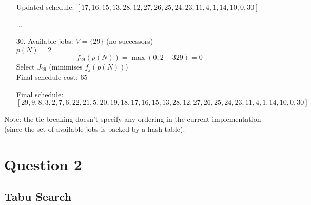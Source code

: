 \documentclass[fleqn]{article}
\begin{document}
\begin{enumerate}
      Updated schedule: $[17, 16, 15, 13, 28, 12, 27, 26, 25, 24, 23, 11, 4, 1, 14, 10, 0, 30]$

      \item[...]

      \item[30.] Available jobs: $V = \{ 29 \}$ (no successors) \\
      $p(N) = 2$
      \[
      f_{29}(p(N)) = \max(0, 2 - 329) = 0
      \]    
      Select $J_{29}$ (minimises $f_j(p(N))$) \\
      Final schedule cost: 65

      Final schedule: $[29, 9, 8, 3, 2, 7, 6, 22, 21, 5, 20, 19, 18, 17, 16, 15, 13, 28, 12, 27, 26, 25, 24, 23, 11, 4, 1, 14, 10, 0, 30]$
    \end{enumerate}

    Note: the tie breaking doesn't specify any ordering in the current implementation (since the set of available jobs is backed by a hash table).

  \section{Question 2}
  \subsection{Tabu Search}
\end{document}
